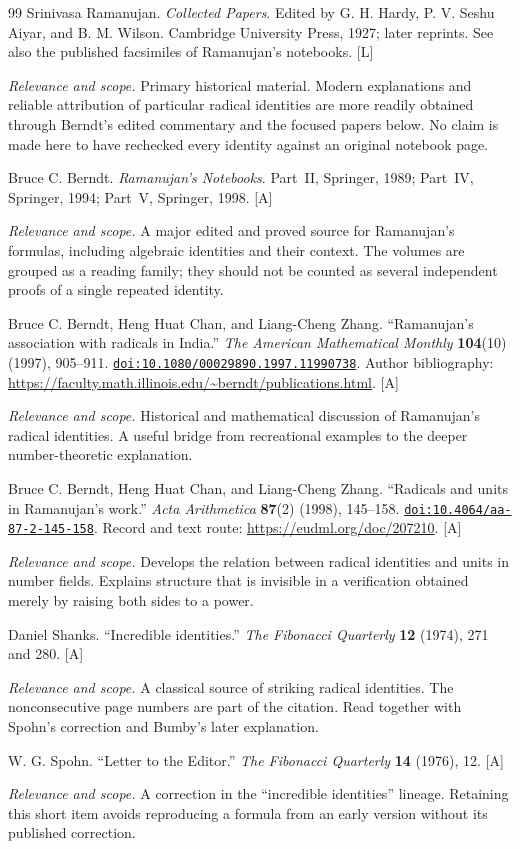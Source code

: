 \documentclass[11pt,oneside]{article}
\numberwithin{equation}{section}
\theoremstyle{definition}
\theoremstyle{remark}
\newcommand{\doi}[1]{\href{https://doi.org/#1}{\nolinkurl{doi:#1}}}
\newcommand{\status}[1]{\textsf{\small[#1]}}
\newcommand{\entrynote}[1]{\par\smallskip\noindent\emph{Relevance and scope.} #1}
\begin{document}
\begin{thebibliography}{99}
Srinivasa Ramanujan. \emph{Collected Papers}. Edited by G. H. Hardy, P. V. Seshu Aiyar, and B. M. Wilson. Cambridge University Press, 1927; later reprints. See also the published facsimiles of Ramanujan's notebooks. \status{L}
\entrynote{Primary historical material. Modern explanations and reliable attribution of particular radical identities are more readily obtained through Berndt's edited commentary and the focused papers below. No claim is made here to have rechecked every identity against an original notebook page.}

Bruce C. Berndt. \emph{Ramanujan's Notebooks}. Part~II, Springer, 1989; Part~IV, Springer, 1994; Part~V, Springer, 1998. \status{A}
\entrynote{A major edited and proved source for Ramanujan's formulas, including algebraic identities and their context. The volumes are grouped as a reading family; they should not be counted as several independent proofs of a single repeated identity.}

Bruce C. Berndt, Heng Huat Chan, and Liang-Cheng Zhang. ``Ramanujan's association with radicals in India.'' \emph{The American Mathematical Monthly} \textbf{104}(10) (1997), 905--911. \doi{10.1080/00029890.1997.11990738}. Author bibliography: \url{https://faculty.math.illinois.edu/~berndt/publications.html}. \status{A}
\entrynote{Historical and mathematical discussion of Ramanujan's radical identities. A useful bridge from recreational examples to the deeper number-theoretic explanation.}

Bruce C. Berndt, Heng Huat Chan, and Liang-Cheng Zhang. ``Radicals and units in Ramanujan's work.'' \emph{Acta Arithmetica} \textbf{87}(2) (1998), 145--158. \doi{10.4064/aa-87-2-145-158}. Record and text route: \url{https://eudml.org/doc/207210}. \status{A}
\entrynote{Develops the relation between radical identities and units in number fields. Explains structure that is invisible in a verification obtained merely by raising both sides to a power.}

Daniel Shanks. ``Incredible identities.'' \emph{The Fibonacci Quarterly} \textbf{12} (1974), 271 and 280. \status{A}
\entrynote{A classical source of striking radical identities. The nonconsecutive page numbers are part of the citation. Read together with Spohn's correction and Bumby's later explanation.}

W. G. Spohn. ``Letter to the Editor.'' \emph{The Fibonacci Quarterly} \textbf{14} (1976), 12. \status{A}
\entrynote{A correction in the ``incredible identities'' lineage. Retaining this short item avoids reproducing a formula from an early version without its published correction.}


\end{thebibliography}
\end{document}

